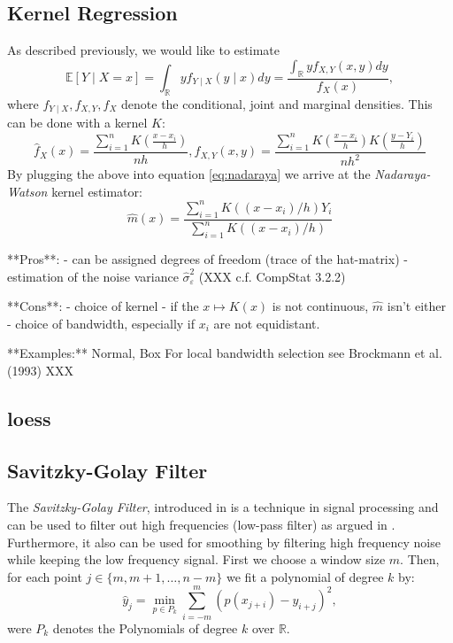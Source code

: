 \subsection{Kernel Regression}
\label{sec:Kernel}
As described previously, we would like to estimate
\begin{equation}
    \label{eq:nadaraya}
    \mathbb{E}[Y \mid X=x]
    = \int_{\mathbb{R}} y f_{Y \mid X}(y \mid x) d y
    =\frac{\int_{\mathbb{R}} y f_{X, Y}(x, y) d y}{f_{X}(x)},
\end{equation}
where $f_{Y \mid X}, f_{X, Y}, f_{X}$ denote the conditional, joint and marginal densities.
This can be done with a kernel $K$:
$$
    \hat{f}_{X}(x)=\frac{\sum_{i=1}^{n} K\left(\frac{x-x_{i}}{h}\right)}{n h}, \hat{f}_{X, Y}(x, y)=\frac{\sum_{i=1}^{n} K\left(\frac{x-x_{i}}{h}\right) K\left(\frac{y-Y_{i}}{h}\right)}{n h^{2}}
$$
By plugging the above into equation \ref{eq:nadaraya} we arrive at the \textit{Nadaraya-Watson} kernel estimator:
$$\hat{m}(x)=\frac{\sum_{i=1}^{n} K\left(\left(x-x_{i}\right) / h\right) Y_{i}}{\sum_{i=1}^{n} K\left(\left(x-x_{i}\right) / h\right)}$$

**Pros**:
- can be assigned degrees of freedom (trace of the hat-matrix)
- estimation of the noise variance $\hat \sigma_\varepsilon^2$ (XXX c.f. CompStat 3.2.2)

**Cons**:
- choice of kernel
- if the $x \mapsto K(x)$ is not continuous, $\hat m $ isn't either
- choice of bandwidth, especially if $x_i$ are not equidistant.

**Examples:**
Normal, Box
For local bandwidth selection see Brockmann et al. (1993) XXX


\subsection{loess}
\label{sec:loess}


\subsection{Savitzky-Golay Filter}
\label{sec:Savitzky–Golay}
The \textit{Savitzky-Golay Filter}, introduced in \cite{savitzkySmoothingDifferentiationData1964} is a technique in signal processing and can be used to filter out high frequencies (low-pass filter) as argued in \cite{schaferWhatSavitzkyGolayFilter2011}. Furthermore, it also can be used for smoothing by filtering high frequency noise while keeping the low frequency signal.
First we choose a window size $m$. Then, for each point $j \in \{m, m+1, \dots, n-m\}$ we fit a polynomial of degree $k$ by:
$$\hat y_j=\min_{p\in P_k}\sum_{i=-m}^{m}(p (x_{j+i})-y_{i+j})^{2},$$
were $P_k$ denotes the Polynomials of degree $k$ over $\mathbb R$.

